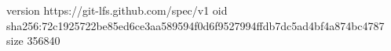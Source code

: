 version https://git-lfs.github.com/spec/v1
oid sha256:72c1925722be85ed6ce3aa589594f0d6f9527994ffdb7dc5ad4bf4a874bc4787
size 356840
